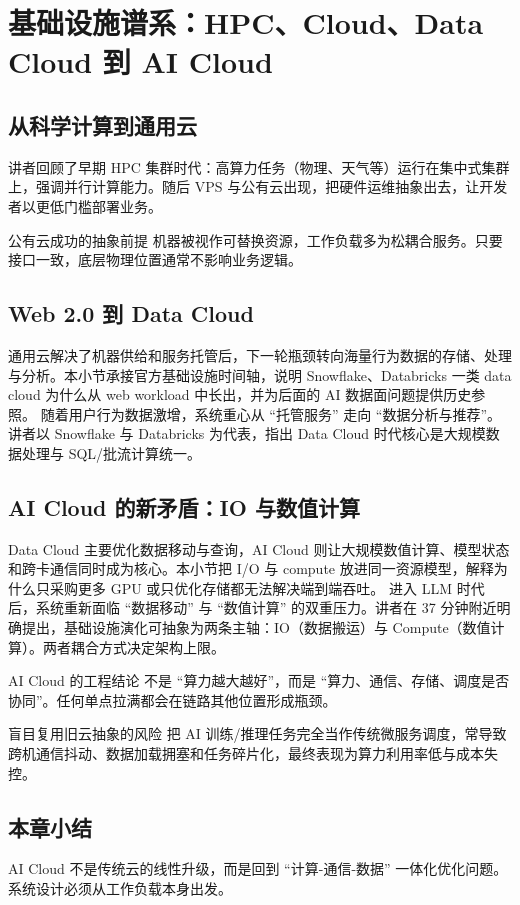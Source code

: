 \section{基础设施谱系：HPC、Cloud、Data Cloud 到 AI Cloud}

\subsection{从科学计算到通用云}
讲者回顾了早期 HPC 集群时代：高算力任务（物理、天气等）运行在集中式集群上，强调并行计算能力。随后 VPS 与公有云出现，把硬件运维抽象出去，让开发者以更低门槛部署业务。

\begin{knowledgebox}{公有云成功的抽象前提}
机器被视作可替换资源，工作负载多为松耦合服务。只要接口一致，底层物理位置通常不影响业务逻辑。
\end{knowledgebox}

\subsection{Web 2.0 到 Data Cloud}
通用云解决了机器供给和服务托管后，下一轮瓶颈转向海量行为数据的存储、处理与分析。本小节承接官方基础设施时间轴，说明 Snowflake、Databricks 一类 data cloud 为什么从 web workload 中长出，并为后面的 AI 数据面问题提供历史参照。
随着用户行为数据激增，系统重心从 ``托管服务'' 走向 ``数据分析与推荐''。讲者以 Snowflake 与 Databricks 为代表，指出 Data Cloud 时代核心是大规模数据处理与 SQL/批流计算统一。

\subsection{AI Cloud 的新矛盾：IO 与数值计算}
Data Cloud 主要优化数据移动与查询，AI Cloud 则让大规模数值计算、模型状态和跨卡通信同时成为核心。本小节把 I/O 与 compute 放进同一资源模型，解释为什么只采购更多 GPU 或只优化存储都无法解决端到端吞吐。
进入 LLM 时代后，系统重新面临 ``数据移动'' 与 ``数值计算'' 的双重压力。讲者在 37 分钟附近明确提出，基础设施演化可抽象为两条主轴：IO（数据搬运）与 Compute（数值计算）。两者耦合方式决定架构上限。

\begin{importantbox}{AI Cloud 的工程结论}
不是 ``算力越大越好''，而是 ``算力、通信、存储、调度是否协同''。任何单点拉满都会在链路其他位置形成瓶颈。
\end{importantbox}

\begin{warningbox}{盲目复用旧云抽象的风险}
把 AI 训练/推理任务完全当作传统微服务调度，常导致跨机通信抖动、数据加载拥塞和任务碎片化，最终表现为算力利用率低与成本失控。
\end{warningbox}

\subsection{本章小结}
AI Cloud 不是传统云的线性升级，而是回到 ``计算-通信-数据'' 一体化优化问题。系统设计必须从工作负载本身出发。

